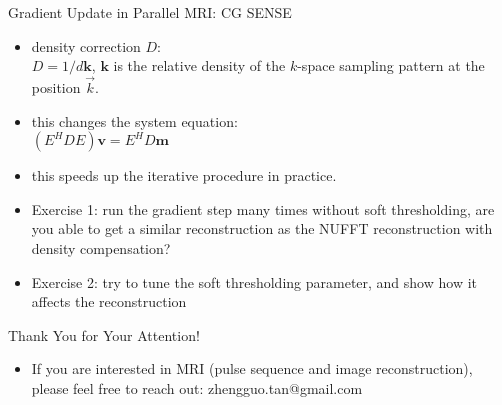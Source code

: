 \begin{frame}{Gradient Update in Parallel MRI: CG SENSE}

	\begin{itemize}
		\item density correction $D$:\\
		$D = 1 / d \mathbf{k}$, $\mathbf{k}$ is the relative density of the $k$-space sampling pattern at the position $\vec{k}$.
		\vspace{2em}
		\item this changes the system equation:\\
		$(E^H D E) \mathbf{v} = E^H D \mathbf{m}$
		\vspace{2em}
		\item <2-> this speeds up the iterative procedure in practice.
		\vspace{1em}
		\item <3-> Exercise 1: run the gradient step many times without soft thresholding, are you able to get a similar reconstruction as the NUFFT reconstruction with density compensation?
		\vspace{1em}
		\item <4-> Exercise 2: try to tune the soft thresholding parameter, and show how it affects the reconstruction

	\end{itemize}

\end{frame}




\begin{frame}{Thank You for Your Attention!}
    \begin{itemize}
        \item If you are interested in MRI (pulse sequence and image reconstruction), please feel free to reach out: zhengguo.tan@gmail.com
    \end{itemize}
\end{frame}
